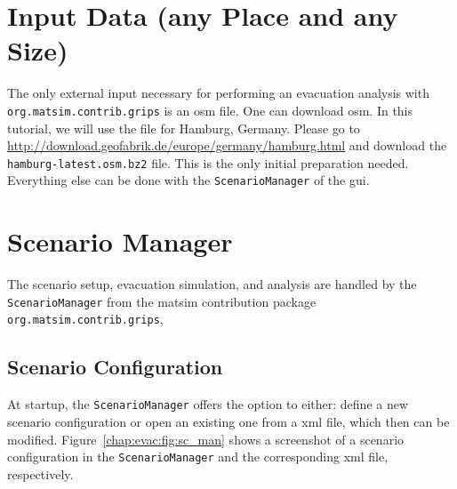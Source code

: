 \section{Input Data (any Place and any Size)}
\label{grips:input}
The only external input necessary for performing an evacuation analysis with \lstinline|org.matsim.contrib.grips| is an \gls{osm} file.
One can download \gls{osm}.
In this tutorial, we will use the file for Hamburg, Germany. Please go to \url{http://download.geofabrik.de/europe/germany/hamburg.html} and download the \lstinline|hamburg-latest.osm.bz2| file. This is the only initial preparation needed. Everything else can be done with the \lstinline|ScenarioManager| of the \gls{gui}.

\section{Scenario Manager}
\label{grips:scm}
The scenario setup, evacuation simulation, and analysis are handled by the \lstinline|ScenarioManager| from the \gls{matsim} contribution package \lstinline|org.matsim.contrib.grips|, 
\subsection{Scenario Configuration}
At startup, the \lstinline|ScenarioManager| offers the option to either: define a new scenario configuration or open an existing one from a \gls{xml} file, which then can be modified. Figure~\ref{chap:evac:fig:sc_man} shows a screenshot of a scenario configuration in the \lstinline|ScenarioManager| and the corresponding \gls{xml} file, respectively.

